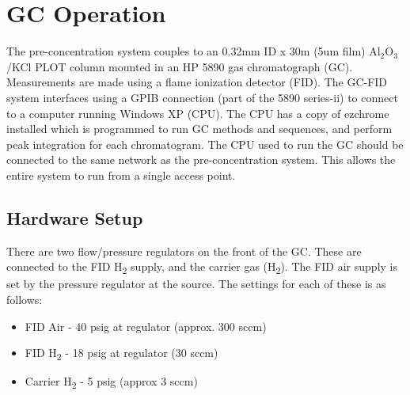 \section{GC Operation}
The pre-concentration system couples to an 0.32mm ID x 30m (5um film) Al$_2$O$_3$/KCl PLOT column mounted in an HP 5890 gas chromatograph (GC). Measurements are made using a flame ionization detector (FID). The GC-FID system interfaces using a GPIB connection (part of the 5890 series-ii) to connect to a computer running Windows XP (CPU). The CPU has a copy of ezchrome installed which is programmed to run GC methods and sequences, and perform peak integration for each chromatogram. The CPU used to run the GC should be connected to the same network as the pre-concentration system. This allows the entire system to run from a single access point.


\subsection{Hardware Setup}
There are two flow/pressure regulators on the front of the GC. These are connected to the FID H\textsubscript{2} supply, and the carrier gas (H\textsubscript{2}). The FID air supply is set by the pressure regulator at the source. The settings for each of these is as follows:

\begin{itemize}
    \item FID Air - 40 psig at regulator (approx. 300 sccm)
    \item FID H\textsubscript{2} - 18 psig at regulator (30 sccm)
    \item Carrier H\textsubscript{2} - 5 psig (approx 3 sccm)
\end{itemize}

